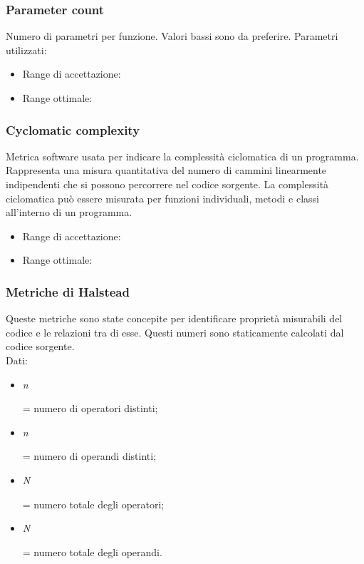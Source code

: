 \documentclass[a4paper,11pt]{article}
\begin{document}
\subsubsection{Parameter count}
Numero di parametri per funzione. Valori bassi sono da preferire.
Parametri utilizzati:
\begin{itemize}
	\item Range di accettazione: \begin{math}[0 - 7]\end{math}
	\item Range ottimale: \begin{math}[0 - 5]\end{math}
	\end{itemize}
\subsubsection{Cyclomatic complexity}
Metrica software usata per indicare la complessità ciclomatica di un programma. Rappresenta una misura quantitativa del numero di cammini linearmente indipendenti che si possono percorrere nel codice sorgente.  
La complessità ciclomatica può essere misurata per funzioni individuali, metodi e classi all'interno di un programma.
\begin{itemize}
	\item Range di accettazione: \begin{math}[0 - 15]\end{math}
	\item Range ottimale: \begin{math}[0 - 10]\end{math}
	\end{itemize}
\subsubsection{Metriche di Halstead} Queste metriche sono state concepite per identificare proprietà misurabili del codice e le relazioni tra di esse. Questi numeri sono staticamente calcolati dal codice sorgente.\\
Dati: 
\begin{itemize}
\item \textit{n}\begin{tiny}{} \end{tiny} = numero di operatori distinti;
\item \textit{n}\begin{tiny}{} \end{tiny} = numero di operandi distinti;
\item \textit{N}\begin{tiny}{} \end{tiny} = numero totale degli operatori;
\item \textit{N}\begin{tiny}{} \end{tiny} = numero totale degli operandi.
\end{itemize}
\end{document}
